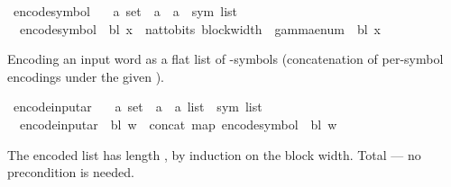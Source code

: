 \begin{isabellebody}
\begin{isamarkuptext}
\end{isamarkuptext}\isamarkuptrue%
\isamarkupfalse%
\ encode{\isacharunderscore}{\kern0pt}symbol\ {\isacharcolon}{\kern0pt}{\isacharcolon}{\kern0pt}\isanewline
\ \ {\isachardoublequoteopen}{\isacharprime}{\kern0pt}a\ set\ {\isasymRightarrow}\ {\isacharprime}{\kern0pt}a\ {\isasymRightarrow}\ {\isacharprime}{\kern0pt}a\ {\isasymRightarrow}\ sym{}\ list{\isachardoublequoteclose}\ \isanewline
\ \ {\isachardoublequoteopen}encode{\isacharunderscore}{\kern0pt}symbol\ {\isasymGamma}\ bl\ x\ {\isacharequal}{\kern0pt}\ nat{\isacharunderscore}{\kern0pt}to{\isacharunderscore}{\kern0pt}bits\ {\isacharparenleft}{\kern0pt}block{\isacharunderscore}{\kern0pt}width\ {\isasymGamma}{\isacharparenright}{\kern0pt}\ {\isacharparenleft}{\kern0pt}gamma{\isacharunderscore}{\kern0pt}enum\ {\isasymGamma}\ bl\ x{\isacharparenright}{\kern0pt}{\isachardoublequoteclose}%
\begin{isamarkuptext}%
Encoding an input word as a flat list of -symbols
  (concatenation of per-symbol encodings under the given \isa{{\isasymGamma}}).%
\end{isamarkuptext}\isamarkuptrue%
\isamarkupfalse%
\ encode{\isacharunderscore}{\kern0pt}input{\isacharunderscore}{\kern0pt}ar\ {\isacharcolon}{\kern0pt}{\isacharcolon}{\kern0pt}\isanewline
\ \ {\isachardoublequoteopen}{\isacharprime}{\kern0pt}a\ set\ {\isasymRightarrow}\ {\isacharprime}{\kern0pt}a\ {\isasymRightarrow}\ {\isacharprime}{\kern0pt}a\ list\ {\isasymRightarrow}\ sym{}\ list{\isachardoublequoteclose}\ \isanewline
\ \ {\isachardoublequoteopen}encode{\isacharunderscore}{\kern0pt}input{\isacharunderscore}{\kern0pt}ar\ {\isasymGamma}\ bl\ w\ {\isacharequal}{\kern0pt}\ concat\ {\isacharparenleft}{\kern0pt}map\ {\isacharparenleft}{\kern0pt}encode{\isacharunderscore}{\kern0pt}symbol\ {\isasymGamma}\ bl{\isacharparenright}{\kern0pt}\ w{\isacharparenright}{\kern0pt}{\isachardoublequoteclose}%
\isadelimdocument
%
\endisadelimdocument
%
\isatagdocument
%
\isamarkuptrue%
%
\endisatagdocument
{\isafolddocument}%
%
\isadelimdocument
%
\endisadelimdocument
%
\begin{isamarkuptext}%
The encoded list has length , by induction
  on the block width.  Total — no  precondition is
  needed.%
\end{isamarkuptext}\isamarkuptrue%
\isamarkupfalse%

\end{isabellebody}
